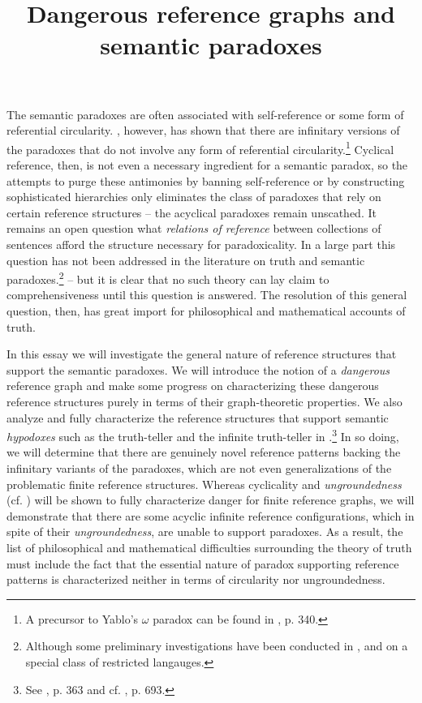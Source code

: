 \documentclass[12pt]{article}
\title{Dangerous reference graphs and semantic paradoxes}
\theoremstyle{remark}
\newcommand{\prg}{\hspace{0.25in}}
\begin{document}

\maketitle



\noindent The semantic paradoxes are often associated with self-reference or some form of referential circularity. \cite{yablo93}, however,  has shown that there are infinitary versions of the paradoxes that do not involve any form of referential circularity.\footnote{A precursor to Yablo's $\omega$ paradox can be found in \cite{yablo85}, p. 340.}  Cyclical reference, then, is not even a necessary ingredient for a semantic paradox, so the attempts to purge these antimonies by banning self-reference or by constructing sophisticated hierarchies only eliminates the class of paradoxes that rely on certain reference structures -- the acyclical paradoxes remain unscathed. It remains an open question what \textit{relations of reference} between collections of sentences afford the structure necessary for paradoxicality. In a large part this question has not been addressed in the literature on truth and semantic paradoxes.\footnote{Although some preliminary investigations have been conducted in \cite{yablo82}, \cite{yablo06} and \cite{cook} on a special class of restricted langauges.} -- but it is clear that no such theory can lay claim to comprehensiveness until this question is answered. The resolution of this general question, then, has great import for philosophical and mathematical accounts of truth.

\prg In this essay we will investigate the general nature of reference structures that support the semantic paradoxes. We will introduce the notion of a \textit{dangerous} reference graph and make some progress on characterizing these dangerous reference structures purely in terms of their graph-theoretic properties.  We also analyze and fully characterize the reference structures that support semantic \textit{hypodoxes} such as the truth-teller and the infinite truth-teller in \cite{burge82}.\footnote{See \cite{burge82}, p. 363 and cf. \cite{kripke75}, p. 693.}  In so doing, we will determine that there are genuinely novel reference patterns backing the infinitary variants of the paradoxes, which are not even generalizations of the problematic finite reference structures.  Whereas cyclicality and \textit{ungroundedness} (cf. \cite{kripke75}) will be shown to fully characterize danger for finite reference graphs, we will demonstrate that there are some acyclic infinite reference configurations, which in spite of their \textit{ungroundedness}, are unable to support paradoxes.  As a result, the list of philosophical and mathematical difficulties surrounding the theory of truth must include the fact that the essential nature of paradox supporting reference patterns is characterized  neither in terms of circularity nor ungroundedness.   
\end{document}
